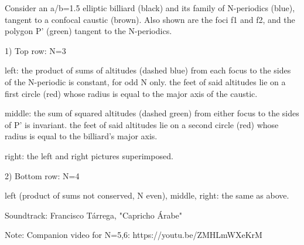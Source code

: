 Consider an a/b=1.5 elliptic billiard (black) and its family of N-periodics (blue), tangent to a confocal caustic (brown). Also shown are the foci f1 and f2, and the polygon P' (green) tangent to the N-periodics.

1) Top row: N=3

left: the product of sums of altitudes (dashed blue) from each focus to the sides of the N-periodic is constant, for odd N only. the feet of said altitudes lie on a first circle (red) whose radius is equal to the major axis of the caustic.

middle: the sum of squared altitudes (dashed green) from either focus to the sides of P' is invariant. the feet of said altitudes lie on a second circle (red) whose radius is equal to the billiard's major axis.

right: the left and right pictures superimposed.

2) Bottom row: N=4

left (product of sums not conserved, N even), middle, right: the same as above.

Soundtrack: Francisco Tárrega, "Capricho Árabe"

Note: Companion video for N=5,6: https://youtu.be/ZMHLmWXeKrM